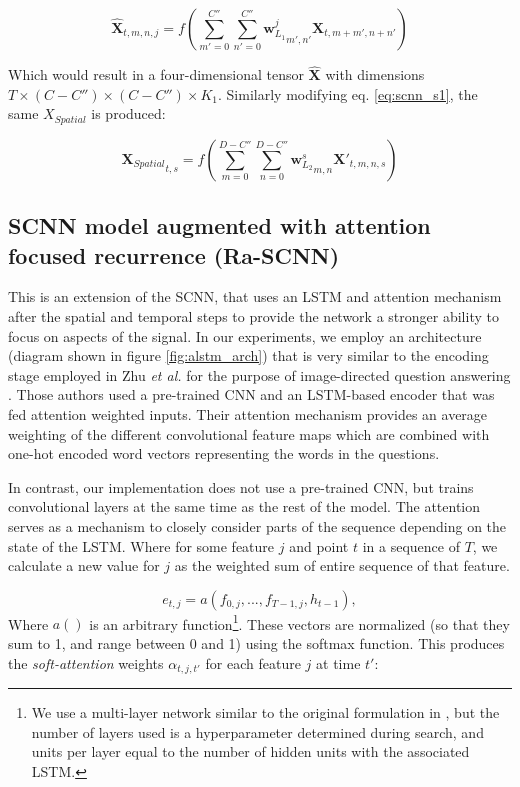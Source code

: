 \documentclass[fleqn,10pt]{wlscirep}
\begin{document}
\begin{equation} \label{eq:s2dcnn_s1}
  \boldsymbol{\hat{X}}_{t, m, n, j} = f\left(\sum_{m'=0}^{C''} \sum_{n'=0}^{C''} {\boldsymbol{w}_{L_1}^j}_{m', n'} \boldsymbol{X}_{t,m+m',n+n'}\right)
\end{equation}

Which would result in a four-dimensional tensor $\boldsymbol{\hat{X}}$ with dimensions $T \times (C-C'') \times (C-C'') \times K_1$. Similarly modifying eq. \ref{eq:scnn_s1}, the same $X_{Spatial}$ is produced:

\begin{equation} \label{eq:scnn_s2}
  {\boldsymbol{X}_{Spatial}}_{t, s} = f\left(\sum_{m=0}^{D-C''}\sum_{n=0}^{D-C''}{\boldsymbol{w}_{L_2}^s}_{m,n} \boldsymbol{X'}_{t, m, n, s}\right)
\end{equation}

\subsection*{SCNN model augmented with attention focused recurrence (Ra-SCNN)} 

This is an extension of the SCNN, that uses an LSTM and attention mechanism after the spatial and temporal steps to provide the network a stronger ability to focus on aspects of the signal. In our experiments, we employ an architecture (diagram shown in figure \ref{fig:alstm_arch}) that is very similar to the encoding stage employed in Zhu {\em et al.} for the purpose of image-directed question answering \cite{Zhu}. Those authors used a pre-trained CNN and an LSTM-based encoder that was fed attention weighted inputs. Their attention mechanism provides an average weighting of the different convolutional feature maps which are combined with one-hot encoded word vectors representing the words in the questions.

In contrast, our implementation does not use a pre-trained CNN, but trains convolutional layers at the same time as the rest of the model. The attention serves as a mechanism to closely consider parts of the sequence depending on the state of the LSTM. Where for some feature $j$ and point $t$ in a sequence of $T$, we calculate a new value for $j$ as the weighted sum of entire sequence of that feature.  

\begin{equation} 
  e_{t, j} = a(f_{0, j},..., f_{T-1, j}, h_{t-1}),
\end{equation}
Where $a()$ is an arbitrary function\footnote{We use a multi-layer network similar to the original formulation in \cite{XuKELVINXU}, but the number of layers used is a hyperparameter determined during search, and units per layer equal to the number of hidden units with the associated LSTM.}. These vectors are normalized (so that they sum to 1, and range between 0 and 1) using the softmax function. This produces the {\em soft-attention} weights $\alpha_{t,j,t'}$ for each feature $j$ at time $t'$:
\end{document}
